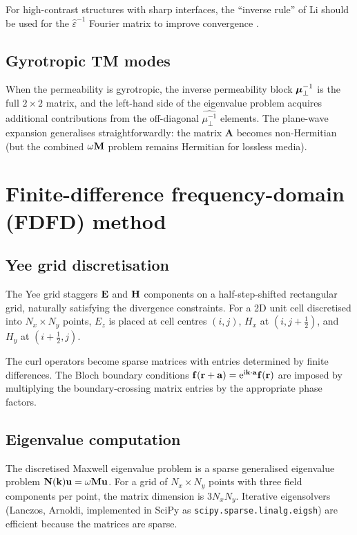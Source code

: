 For high-contrast structures with sharp interfaces, the ``inverse
rule'' of Li should be used for the $\hat\varepsilon^{-1}$ Fourier
matrix to improve convergence
\cite{lee2022calculation}.

\subsection{Gyrotropic TM modes}
\label{sec:appC-gyro}

When the permeability is gyrotropic, the inverse permeability block
$\boldsymbol{\mu}_\perp^{-1}$ is the full $2\times 2$ matrix, and the left-hand
side of the eigenvalue problem acquires additional contributions from
the off-diagonal $\widehat{\mu_\perp^{-1}}$ elements.  The
plane-wave expansion generalises straightforwardly: the matrix
$\mathbf{A}$ becomes non-Hermitian (but the combined $\omega\mathbf{M}$
problem remains Hermitian for lossless media).

\section{Finite-difference frequency-domain (FDFD) method}
\label{sec:appC-fdfd}

\subsection{Yee grid discretisation}
\label{sec:appC-yee}

The Yee grid staggers $\mathbf{E}$ and $\mathbf{H}$ components on a
half-step-shifted rectangular grid, naturally satisfying the divergence
constraints.  For a 2D unit cell discretised into $N_x\times N_y$
points, $E_z$ is placed at cell centres $(i,j)$, $H_x$ at
$(i,j+\frac{1}{2})$, and $H_y$ at $(i+\frac{1}{2},j)$.

The curl operators become sparse matrices with entries determined by
finite differences.  The Bloch boundary conditions
$\mathbf{f}(\mathbf{r}+\mathbf{a})=\mathrm{e}^{\mathrm{i}\mathbf{k}\cdot\mathbf{a}}\mathbf{f}(\mathbf{r})$ are
imposed by multiplying the boundary-crossing matrix entries by the
appropriate phase factors.

\subsection{Eigenvalue computation}
\label{sec:appC-fdfd-eig}

The discretised Maxwell eigenvalue problem is a sparse generalised
eigenvalue problem $\mathbf{N}(\mathbf{k})\mathbf{u}=\omega\mathbf{M}
\mathbf{u}$.  For a grid of $N_x\times N_y$ points with three field
components per point, the matrix dimension is $3N_xN_y$.  Iterative
eigensolvers (Lanczos, Arnoldi, implemented in SciPy as
\verb|scipy.sparse.linalg.eigsh|) are efficient because the matrices
are sparse.

